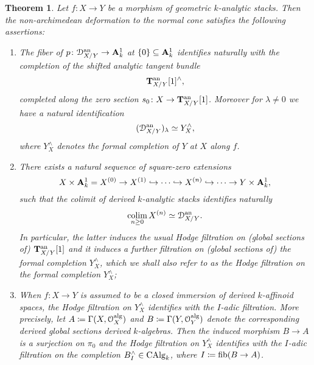 \documentclass[10pt,a4paper,reqno]{amsart} %
\theoremstyle{plain}
\newtheorem{thm}{Theorem}[section]
\theoremstyle{definition}
\theoremstyle{remark}
\numberwithin{equation}{section}
\begin{document}
\begin{thm} \label{intro-thm2}
    Let $f \colon X \to Y$ be a morphism of geometric $k$-analytic stacks. Then the non-archimedean deformation to the normal cone satisfies the following
    assertions:
    \begin{enumerate}
        \item The fiber of $p \colon \mathcal D_{X/ Y}^\mathrm{an} \to \mathbf A^1_k$ at $\{ 0\} \subseteq \mathbf A^1_k$ identifies naturally with the completion of the shifted analytic
        tangent bundle
            \[
                \mathbf T^\mathrm{an}_{X/ Y}[1]^\wedge,  
            \]
        completed along the zero section $s_0 \colon X \to \mathbf T^\mathrm{an}_{X/ Y}[1]$. Moreover for $\lambda \neq 0$ we have a natural identification
            \[
                (\mathcal D_{X/ Y}^\mathrm{an})_\lambda  \simeq Y^\wedge_X,
            \]
        where $Y^\wedge_X$ denotes the formal completion of $Y$ at $X$ along $f$.
        \item There exists a natural sequence of square-zero extensions
            \[
                X \times \mathbf A^1_k = X^{(0)} \to X^{(1)} \hookrightarrow \dots \hookrightarrow X^{(n)} \hookrightarrow \dots \to Y \times \mathbf A^1_k, 
            \]
        such that the colimit of derived $k$-analytic stacks identifies naturally
            \[
                \operatorname*{colim}_{n \ge 0} X^{(n)} \simeq \mathcal D_{X/ Y}^\mathrm{an}.  
            \]
        In particular, the latter induces the usual Hodge filtration on (global sections of) $\mathbf T^\mathrm{an}_{X/ Y}[1]$ and it induces a further filtration
        on (global sections of) the formal completion $Y^\wedge_X$, which we shall also refer to as the \emph{Hodge filtration} on the formal completion $Y^\wedge_X$;
        \item When $f \colon X \to Y$ is assumed to be a closed immersion of derived $k$-affinoid spaces, the Hodge filtration on $Y^\wedge_X$ identifies with the $I$-adic filtration.
        More precisely, let $A \coloneqq \Gamma(X, \mathcal O_X^\mathrm{alg})$ and $B \coloneqq \Gamma(Y, \mathcal O_Y^\mathrm{alg})$ denote the corresponding derived global sections derived $k$-algebras. Then the induced morphism
        $B \to A$ is a surjection on $\pi_0$ and the Hodge filtration on $Y^\wedge_X$ identifies with the $I$-adic filtration on the completion $B^\wedge_I \in \mathrm{CAlg}_k$, where
        $I \coloneqq \mathrm{fib}(B \to A)$.
    \end{enumerate}
\end{thm}
\end{document}
